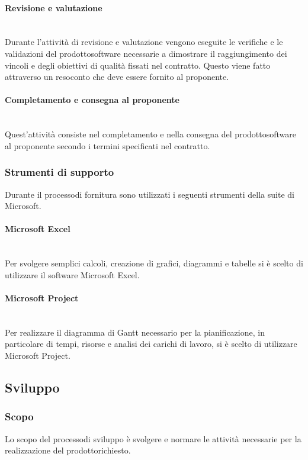 			\paragraph{Revisione e valutazione}\mbox{}\\ [1mm]
				Durante l'attività di revisione e valutazione vengono eseguite le verifiche e le validazioni del prodotto\glosp software necessarie a dimostrare il raggiungimento dei vincoli e degli obiettivi di qualità fissati nel contratto. Questo viene fatto attraverso un resoconto che deve essere fornito al proponente.
			\paragraph{Completamento e consegna al proponente}\mbox{}\\ [1mm]
				Quest'attività consiste nel completamento e nella consegna del prodotto\glosp software al proponente secondo i termini specificati nel contratto. 
		\subsubsection{Strumenti di supporto}
		Durante il processo\glosp di fornitura sono utilizzati i seguenti strumenti della suite di Microsoft.
			\paragraph{Microsoft Excel}\mbox{}\\ [1mm]
			Per svolgere semplici calcoli, creazione di grafici, diagrammi e tabelle si è scelto di utilizzare il software Microsoft Excel.
			\paragraph{Microsoft Project}\mbox{}\\ [1mm]
			Per realizzare il diagramma di Gantt necessario per la pianificazione, in particolare di tempi, risorse e analisi dei carichi di lavoro, si è scelto di utilizzare Microsoft Project.
	\subsection{Sviluppo}
		\subsubsection{Scopo}
		Lo scopo del processo\glosp di sviluppo è svolgere e normare le attività necessarie per la realizzazione del prodotto\glosp richiesto.
